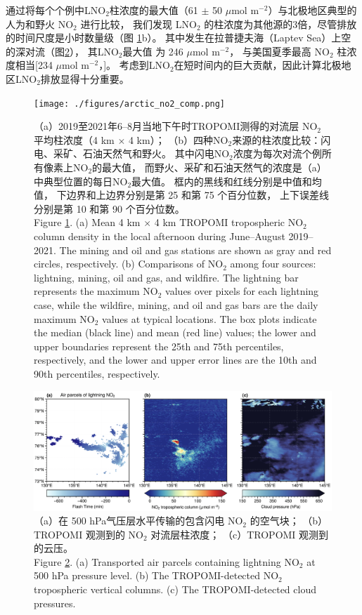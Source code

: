 通过将每个个例中LNO$_2$柱浓度的最大值（61 $\pm$ 50 $\mu$mol m$^{-2}$）与北极地区典型的人为和野火 NO$_2$ 进行比较，
我们发现 LNO$_2$ 的柱浓度为其他源的3倍，尽管排放的时间尺度是小时数量级（图 \ref{fig:arctic_no2_comp}b）。
其中发生在拉普捷夫海（Laptev Sea）上空的深对流（图\ref{fig:arctic_large_lno2}），
其LNO$_2$最大值 为 246 $\mu$mol m$^{-2}$，
与美国夏季最高 NO$_2$ 柱浓度相当[234 $\mu$mol m$^{-2}$，\citet{Goldberg.2021a}]。
考虑到LNO$_2$在短时间内的巨大贡献，因此计算北极地区LNO$_2$排放显得十分重要。

\begin{figure}[H]
\centering
\texttt{[image: ./figures/arctic\_no2\_comp.png]}
\caption{
（a）2019至2021年6--8月当地下午时TROPOMI测得的对流层 NO$_2$ 平均柱浓度（4 km $\times$ 4 km）；
（b）四种NO$_2$来源的柱浓度比较：闪电、采矿、石油天然气和野火。
其中闪电NO$_2$浓度为每次对流个例所有像素上NO$_2$的最大值，
而野火、采矿和石油天然气的浓度是（a）中典型位置的每日NO$_2$最大值。
框内的黑线和红线分别是中值和均值，
下边界和上边界分别是第 25 和第 75 个百分位数，
上下误差线分别是第 10 和第 90 个百分位数。\\
Figure \ref{fig:arctic_no2_comp}. (a) Mean 4 km $\times$ 4 km TROPOMI tropospheric NO$_2$ column density in the local afternoon during June--August 2019--2021.
The mining and oil and gas stations are shown as gray and red circles, respectively.
(b) Comparisons of NO$_2$ among four sources: lightning, mining, oil and gas, and wildfire.
The lightning bar represents the maximum NO$_2$ values over pixels for each lightning case,
while the wildfire, mining, and oil and gas bars are the daily maximum NO$_2$ values at typical locations.
The box plots indicate the median (black line) and mean (red line) values; the lower and upper boundaries represent the 25th and 75th percentiles, respectively, and the lower and upper error lines are the 10th and 90th percentiles, respectively.
}
\label{fig:arctic_no2_comp}
\end{figure}

\begin{figure}[H]
\centering
\includegraphics[width=15cm]{./figures/arctic_large_lno2.png}
\caption{
（a）在 500 hPa气压层水平传输的包含闪电 NO$_2$ 的空气块；
（b）TROPOMI 观测到的 NO$_2$ 对流层柱浓度；
（c）TROPOMI 观测到的云压。\\
Figure \ref{fig:arctic_large_lno2}. (a) Transported air parcels containing lightning NO$_2$ at 500 hPa pressure level.
(b) The TROPOMI-detected NO$_2$ tropospheric vertical columns.
(c) The TROPOMI-detected cloud pressures.
}
\label{fig:arctic_large_lno2}
\end{figure}


